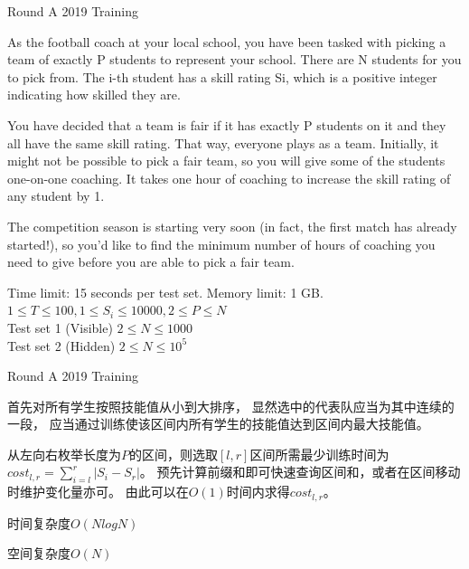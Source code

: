 \documentclass{beamer}
\begin{document}
\begin{frame}{Round A 2019 Training}

    As the football coach at your local school, you have been tasked with picking a team of exactly P students to represent your school. There are N students for you to pick from. The i-th student has a skill rating Si, which is a positive integer indicating how skilled they are.

    You have decided that a team is fair if it has exactly P students on it and they all have the same skill rating. That way, everyone plays as a team. Initially, it might not be possible to pick a fair team, so you will give some of the students one-on-one coaching. It takes one hour of coaching to increase the skill rating of any student by 1.
    
    The competition season is starting very soon (in fact, the first match has already started!), so you'd like to find the minimum number of hours of coaching you need to give before you are able to pick a fair team.
    
    Time limit: 15 seconds per test set. Memory limit: 1 GB.\\
    $1\leq T\leq 100, 1\leq S_i\leq 10000, 2\leq P\leq N$\\
    Test set 1 (Visible) $2\leq N\leq 1000$\\
    Test set 2 (Hidden) $2\leq N\leq 10^5$
    
\end{frame}

\begin{frame}{Round A 2019 Training}

    首先对所有学生按照技能值从小到大排序，
    显然选中的代表队应当为其中连续的一段，
    应当通过训练使该区间内所有学生的技能值达到区间内最大技能值。
    
    从左向右枚举长度为$P$的区间，则选取$[l,r]$区间所需最少训练时间为
    $cost_{l,r}=\sum_{i=l}^{r}{|S_i-S_r|}$。
    预先计算前缀和即可快速查询区间和，或者在区间移动时维护变化量亦可。
    由此可以在$O(1)$时间内求得$cost_{l,r}$。
    
    时间复杂度$O(NlogN)$
    
    空间复杂度$O(N)$
    
\end{frame}
\end{document}
